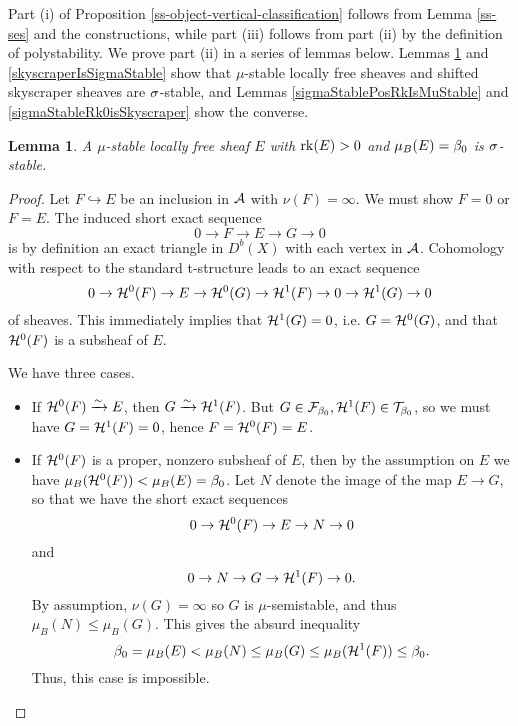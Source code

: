 \documentclass[letterpaper,12pt]{amsart}
\newtheorem{lem}[thm]{Lemma}
\theoremstyle{remark}
\begin{document}
Part (i) of Proposition \ref{ss-object-vertical-classification} follows from Lemma \ref{ss-ses} and the constructions, while part (iii) follows from part (ii) by the definition of polystability. We prove part (ii)
in a series of lemmas below. Lemmas \ref{muStableLfIsSigmaStable} and \ref{skyscraperIsSigmaStable} show that $\mu$-stable locally free sheaves and shifted skyscraper sheaves are $\sigma$-stable, and Lemmas \ref{sigmaStablePosRkIsMuStable} and \ref{sigmaStableRk0isSkyscraper} show the converse.
\begin{lem}\label{muStableLfIsSigmaStable}
    A $\mu$-stable locally free sheaf $E$ with $\operatorname{\mathrm{rk}}(E) > 0$ and $\mu_B(E) = \beta_0$ is $\sigma$-stable.
\end{lem}
\begin{proof}
    Let $F \hookrightarrow E$ be an inclusion in $\mathcal{A}$ with $\nu(F) = \infty$. We must show $F = 0$ or $F = E$. The induced short exact sequence
    \[ 0 \to F \to E \to G \to 0 \]
    is by definition an exact triangle in $D^b(X)$ with each vertex in $\mathcal{A}$. Cohomology with respect to the standard t-structure leads to an exact sequence
    \[ 0 \to \mathcal{H}^0(F) \to E \to \mathcal{H}^0(G) \to \mathcal{H}^1(F) \to 0 \to \mathcal{H}^1(G) \to 0 \]
    of sheaves. This immediately implies that $\mathcal{H}^1(G) = 0$, i.e. $G = \mathcal{H}^0(G)$, and that $\mathcal{H}^0(F)$ is a subsheaf of $E$.
    
    We have three cases.
    \begin{itemize}
        \item If $\mathcal{H}^0(F) \xrightarrow{\sim} E$, then $G \xrightarrow{\sim} \mathcal{H}^1(F)$. But $G \in \mathcal{F}_{\beta_0}, \mathcal{H}^1(F) \in \mathcal{T}_{\beta_0}$, so we must have $G = \mathcal{H}^1(F) = 0$, hence $F = \mathcal{H}^0(F) = E$.
        
        \item If $\mathcal{H}^0(F)$ is a proper, nonzero subsheaf of $E$, then by the assumption on $E$ we have $\mu_B(\mathcal{H}^0(F)) < \mu_B(E) = \beta_0$. Let $N$ denote the image of the map $E \to G$, so that we have the short exact sequences
        \[ 0 \to \mathcal{H}^0(F) \to E \to N \to 0 \]
        and 
        \[ 0 \to N \to G \to \mathcal{H}^1(F) \to 0. \]
        By assumption, $\nu(G) = \infty$ so $G$ is $\mu$-semistable, and thus $\mu_B(N) \le \mu_B(G)$. This gives the absurd inequality 
        \[ \beta_0 = \mu_B(E) < \mu_B(N) \le \mu_B(G) \le \mu_B(\mathcal{H}^1(F)) \le \beta_0. \]
        Thus, this case is impossible.
        

\end{itemize}
\end{proof}
\end{document}
